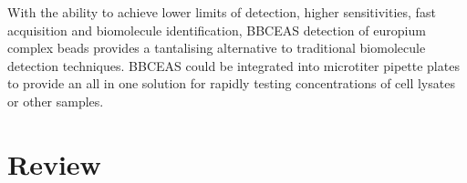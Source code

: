 With the ability to achieve lower limits of detection, higher sensitivities,
fast acquisition and biomolecule identification, \ac{BBCEAS} detection of
europium complex beads provides a tantalising alternative to traditional
biomolecule detection techniques. \ac{BBCEAS} could be integrated into
microtiter pipette plates to provide an all in one solution for rapidly
testing concentrations of cell lysates or other samples.

\section{Review}
